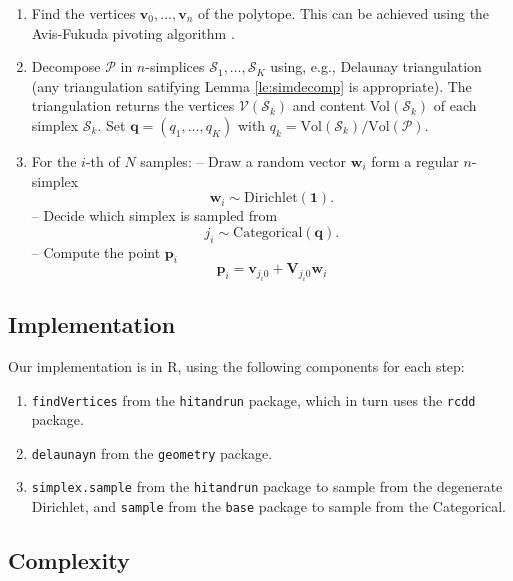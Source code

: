 \documentclass[11pt]{article}
\newcommand{\set}[1]{\mathcal{#1} }
\begin{document}
\begin{enumerate}
	\item Find the vertices $\bm{v}_0, \dots, \bm{v}_n$ of the polytope. This can be achieved using the Avis-Fukuda pivoting algorithm \cite{avis1992}.
	\item Decompose $\set{P}$ in $n$-simplices $\set{S}_1, \dots, \set{S}_K$ using, e.g., Delaunay triangulation (any triangulation satifying Lemma \ref{le:simdecomp} is appropriate). The triangulation returns the vertices $\set{V}(\set{S}_k)$ and content Vol$(\set{S}_k)$ of each simplex $\set{S}_k$. Set $\bm{q} = (q_1, \dots, q_K)$ with $q_k = \mathrm{Vol}(\set{S}_k) / \mathrm{Vol}(\set{P})$.
    \item For the $i$-th of $N$ samples: 
        \subitem -- Draw a random vector $\bm{w}_i$ form a regular $n$-simplex
        \begin{equation}
            \bm{w}_i  \sim \textrm{Dirichlet}(\bm{1}).
        \end{equation}
        \subitem -- Decide which simplex is sampled from 
        \begin{equation}
			j_i \sim \textrm{Categorical}(\bm{q}).
        \end{equation}
        \subitem -- Compute the point $\bm{p}_i$ 
        \begin{equation}
            \bm{p}_i = \bm{v}_{{j_i}0} + \bm{V}_{{j_i}0} \bm{w}_i 
        \end{equation}

\end{enumerate}

\subsection{Implementation}

Our implementation is in R, using the following components for each step:
\begin{enumerate}
	\item \texttt{findVertices} from the \texttt{hitandrun} package, which in turn uses the \texttt{rcdd} package.
	\item \texttt{delaunayn} from the \texttt{geometry} package.
	\item \texttt{simplex.sample} from the \texttt{hitandrun} package to sample from the degenerate Dirichlet, and \texttt{sample} from the \texttt{base} package to sample from the Categorical.
\end{enumerate}

\subsection{Complexity}
\end{document}
